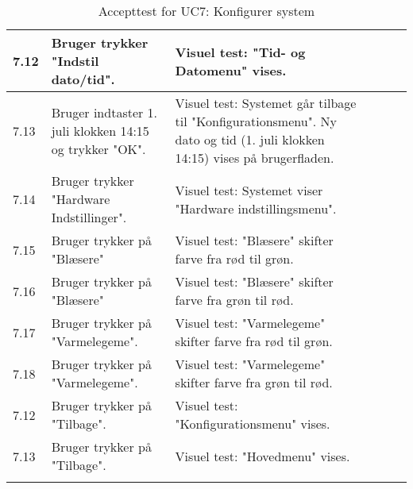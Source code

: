 \begin{longtable}{| l | >{\raggedright}X | >{\raggedright}X | >{\raggedright}X | >{\raggedright\arraybackslash}p{2.3cm} |}
    7.12 & Bruger trykker "Indstil dato/tid". & Visuel test: "Tid- og Datomenu" vises. & ~ & ~ \\ \hline
    7.13 & Bruger indtaster 1. juli klokken 14:15 og trykker "OK". & Visuel test: Systemet går tilbage til "Konfigurationsmenu". Ny dato og tid (1. juli klokken 14:15) vises på brugerfladen. & ~ & ~ \\ \hline
    7.14 & Bruger trykker "Hardware Indstillinger". & Visuel test: Systemet viser "Hardware indstillingsmenu". & ~ & ~ \\ \hline
    7.15 & Bruger trykker på "Blæsere" & Visuel test: "Blæsere" skifter farve fra rød til grøn. & ~ & ~ \\ \hline
    7.16 & Bruger trykker på "Blæsere" & Visuel test: "Blæsere" skifter farve fra grøn til rød. & ~ & ~ \\ \hline
    7.17 & Bruger trykker på "Varmelegeme". & Visuel test: "Varmelegeme" skifter farve fra rød til grøn. & ~ & ~ \\ \hline
    7.18 & Bruger trykker på "Varmelegeme". & Visuel test: "Varmelegeme" skifter farve fra grøn til rød. & ~ & ~ \\ \hline
    7.12 & Bruger trykker på "Tilbage". & Visuel test: "Konfigurationsmenu" vises. & ~ & ~ \\ \hline
    7.13 & Bruger trykker på "Tilbage". & Visuel test: "Hovedmenu" vises. & ~ & ~ \\ \hline
	\caption{Accepttest for UC7: Konfigurer system}\label{tbl:acceptUC7}
\end{longtable}